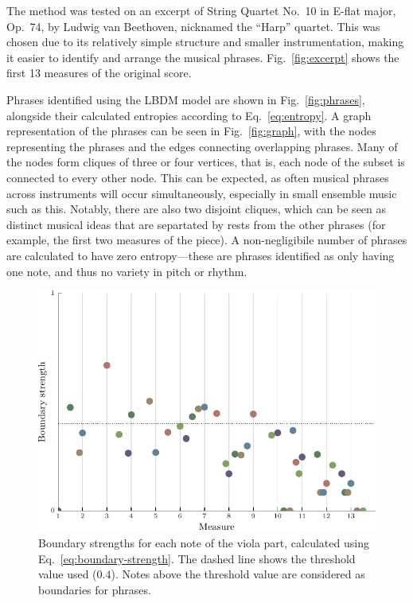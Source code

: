 \documentclass[aps,pra,10pt,twocolumn]{revtex4-2}
\begin{document}
The method was tested on an excerpt of String Quartet No.\ 10 in E-flat major, Op.\ 74, by Ludwig van Beethoven, nicknamed the ``Harp'' quartet. This was chosen due to its relatively simple structure and smaller instrumentation, making it easier to identify and arrange the musical phrases. Fig.\ \ref{fig:excerpt} shows the first 13 measures of the original score.

Phrases identified using the LBDM model are shown in Fig.\ \ref{fig:phrases}, alongside their calculated entropies according to Eq.\ \ref{eq:entropy}. A graph representation of the phrases can be seen in Fig.\ \ref{fig:graph}, with the nodes representing the phrases and the edges connecting overlapping phrases. Many of the nodes form cliques of three or four vertices, that is, each node of the subset is connected to every other node. This can be expected, as often musical phrases across instruments will occur simultaneously, especially in small ensemble music such as this. Notably, there are also two disjoint cliques, which can be seen as distinct musical ideas that are separtated by rests from the other phrases (for example, the first two measures of the piece). A non-negligibile number of phrases are calculated to have zero entropy—these are phrases identified as only having one note, and thus no variety in pitch or rhythm.

\begin{figure}[h]
    \centering
    \includegraphics[width=\linewidth]{../Figures/boundary_offset.pdf}
    \caption{Boundary strengths for each note of the viola part, calculated using Eq.\ \ref{eq:boundary-strength}. The dashed line shows the threshold value used ($0.4$). Notes above the threshold value are considered as boundaries for phrases.}
    \label{fig:boundary-strengths}
\end{figure}
\end{document}

